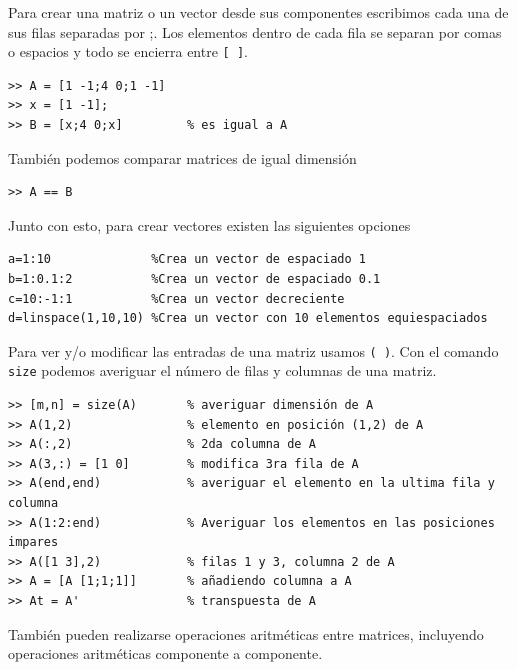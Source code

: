 \documentclass[letter,11pt]{article}
\newcommand\0{\mathbf{0}}
\begin{document}
	Para crear una matriz o un vector desde sus componentes escribimos cada una de sus filas separadas por ;. Los elementos dentro de cada fila se separan por comas o espacios y todo se encierra entre
	\Verb+[ ]+.
	
    \medskip

\begin{lstlisting}
>> A = [1 -1;4 0;1 -1]						
>> x = [1 -1];
>> B = [x;4 0;x]         % es igual a A
\end{lstlisting}

\medskip
	
	Tambi\'en podemos comparar matrices de igual dimensi\'on
	
    \medskip

\begin{lstlisting}
>> A == B
\end{lstlisting}

Junto con esto, para crear vectores existen las siguientes opciones

\begin{lstlisting}
a=1:10				%Crea un vector de espaciado 1
b=1:0.1:2			%Crea un vector de espaciado 0.1
c=10:-1:1			%Crea un vector decreciente
d=linspace(1,10,10)	%Crea un vector con 10 elementos equiespaciados
\end{lstlisting}

	Para ver y/o modificar las entradas de una matriz usamos \Verb+( )+.					
	Con el comando \Verb+size+ podemos averiguar el n\'umero de filas y columnas
	de una matriz.


\begin{lstlisting}				
>> [m,n] = size(A)       % averiguar dimensión de A		
>> A(1,2)                % elemento en posición (1,2) de A
>> A(:,2)                % 2da columna de A
>> A(3,:) = [1 0]        % modifica 3ra fila de A
>> A(end,end)			 % averiguar el elemento en la ultima fila y columna
>> A(1:2:end)			 % Averiguar los elementos en las posiciones impares
>> A([1 3],2)            % filas 1 y 3, columna 2 de A		
>> A = [A [1;1;1]]       % añadiendo columna a A
>> At = A'               % transpuesta de A
\end{lstlisting}
	
	\medskip
	
	Tambi\'en pueden realizarse operaciones aritm\'eticas entre matrices, incluyendo
	operaciones aritm\'eticas componente a componente.
	
	\medskip
\end{document}
